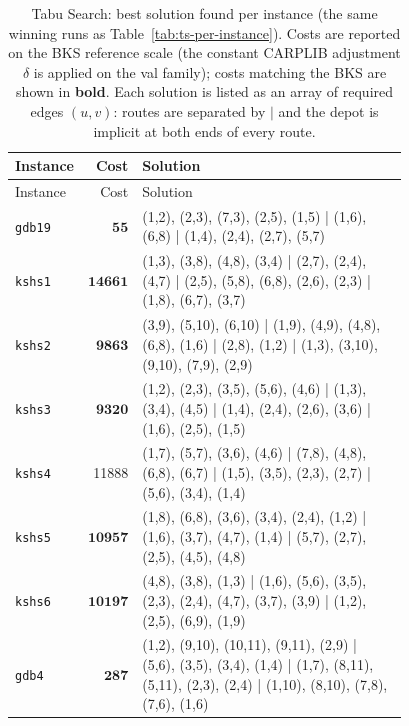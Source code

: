 \begin{landscape}
\begingroup\scriptsize
\begin{longtable}{lr>{\tiny\raggedright\arraybackslash}p{0.78\linewidth}}
\caption{Tabu Search: best solution found per instance (the same winning runs as Table~\ref{tab:ts-per-instance}). Costs are reported on the BKS reference scale (the constant CARPLIB adjustment $\delta$ is applied on the val family); costs matching the BKS are shown in \textbf{bold}. Each solution is listed as an array of required edges $(u,v)$: routes are separated by $|$ and the depot is implicit at both ends of every route.}\label{tab:ts-solutions}\\
\toprule
Instance & Cost & Solution \\
\midrule
\endfirsthead
\toprule
Instance & Cost & Solution \\
\midrule
\endhead
\bottomrule
\endfoot
\texttt{gdb19} & $\mathbf{55}$ & (1,2), (2,3), (7,3), (2,5), (1,5) | (1,6), (6,8) | (1,4), (2,4), (2,7), (5,7) \\[2pt]
\texttt{kshs1} & $\mathbf{14661}$ & (1,3), (3,8), (4,8), (3,4) | (2,7), (2,4), (4,7) | (2,5), (5,8), (6,8), (2,6), (2,3) | (1,8), (6,7), (3,7) \\[2pt]
\texttt{kshs2} & $\mathbf{9863}$ & (3,9), (5,10), (6,10) | (1,9), (4,9), (4,8), (6,8), (1,6) | (2,8), (1,2) | (1,3), (3,10), (9,10), (7,9), (2,9) \\[2pt]
\texttt{kshs3} & $\mathbf{9320}$ & (1,2), (2,3), (3,5), (5,6), (4,6) | (1,3), (3,4), (4,5) | (1,4), (2,4), (2,6), (3,6) | (1,6), (2,5), (1,5) \\[2pt]
\texttt{kshs4} & 11888 & (1,7), (5,7), (3,6), (4,6) | (7,8), (4,8), (6,8), (6,7) | (1,5), (3,5), (2,3), (2,7) | (5,6), (3,4), (1,4) \\[2pt]
\texttt{kshs5} & $\mathbf{10957}$ & (1,8), (6,8), (3,6), (3,4), (2,4), (1,2) | (1,6), (3,7), (4,7), (1,4) | (5,7), (2,7), (2,5), (4,5), (4,8) \\[2pt]
\texttt{kshs6} & $\mathbf{10197}$ & (4,8), (3,8), (1,3) | (1,6), (5,6), (3,5), (2,3), (2,4), (4,7), (3,7), (3,9) | (1,2), (2,5), (6,9), (1,9) \\[2pt]
\texttt{gdb4} & $\mathbf{287}$ & (1,2), (9,10), (10,11), (9,11), (2,9) | (5,6), (3,5), (3,4), (1,4) | (1,7), (8,11), (5,11), (2,3), (2,4) | (1,10), (8,10), (7,8), (7,6), (1,6) \\[2pt]

\end{longtable}
\end{landscape}
